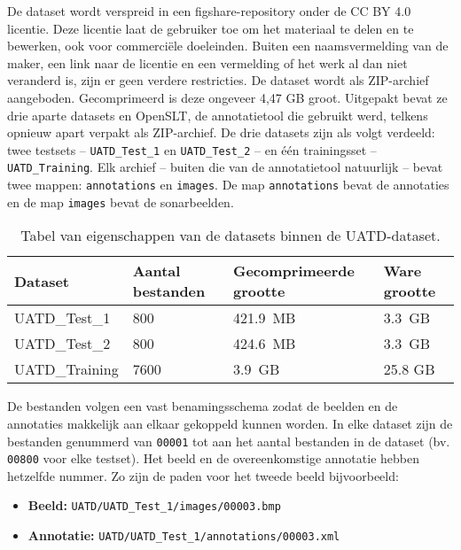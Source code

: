 De dataset wordt verspreid in een figshare-repository onder de CC BY 4.0 licentie. Deze licentie laat de gebruiker toe om het materiaal te delen en te bewerken, ook voor commerciële doeleinden. Buiten een naamsvermelding van de maker, een link naar de licentie en een vermelding of het werk al dan niet veranderd is, zijn er geen verdere restricties. De dataset wordt als ZIP-archief aangeboden. Gecomprimeerd is deze ongeveer 4,47 GB groot. Uitgepakt bevat ze drie aparte datasets en OpenSLT, de annotatietool die gebruikt werd, telkens opnieuw apart verpakt als ZIP-archief. De drie datasets zijn als volgt verdeeld: twee testsets -- \texttt{UATD\_Test\_1} en \texttt{UATD\_Test\_2} -- en één trainingsset -- \texttt{UATD\_Training}. Elk archief -- buiten die van de annotatietool natuurlijk -- bevat twee mappen: \texttt{annotations} en \texttt{images}. De map \texttt{annotations} bevat de annotaties en de map \texttt{images} bevat de sonarbeelden. \autocite{Jian_2022} \\

\begin{table}[H]
    \centering
    \begin{tabular}{llll}
        \toprule
        \textbf{Dataset} & \textbf{Aantal bestanden} & \textbf{Gecomprimeerde grootte} & \textbf{Ware grootte} \\
        \midrule
        UATD\_Test\_1  & 800  & 421.9 MB & 3.3 GB \\
        UATD\_Test\_2  & 800  & 424.6 MB & 3.3 GB \\
        UATD\_Training & 7600 & 3.9 GB   & 25.8 GB \\
        \bottomrule
    \end{tabular}
    \caption[Datasets binnen UATD]{\label{tab:uatd_datasets_overview} Tabel van eigenschappen van de datasets binnen de UATD-dataset. \autocite{Jian_2022}}
\end{table}

De bestanden volgen een vast benamingsschema zodat de beelden en de annotaties makkelijk aan elkaar gekoppeld kunnen worden. In elke dataset zijn de bestanden genummerd van \texttt{00001} tot aan het aantal bestanden in de dataset (bv. \texttt{00800} voor elke testset). Het beeld en de overeenkomstige annotatie hebben hetzelfde nummer. Zo zijn de paden voor het tweede beeld bijvoorbeeld:

\begin{itemize}
    \item \textbf{Beeld:} \texttt{UATD/UATD\_Test\_1/images/00003.bmp}
    \item \textbf{Annotatie:} \texttt{UATD/UATD\_Test\_1/annotations/00003.xml}
\end{itemize}

